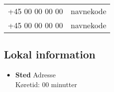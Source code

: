 \begin{multicols}{2}
\begin{tabular}{c|l}
+45 00 00 00 00 & navnekode \\

+45 00 00 00 00 & navnekode \\

\end{tabular}

\subsection{Lokal information}
\begin{itemize}
    
    \item \textbf{Sted}
        Adresse \\
        Køretid: 00 minutter
        
\end{itemize}

\end{multicols}